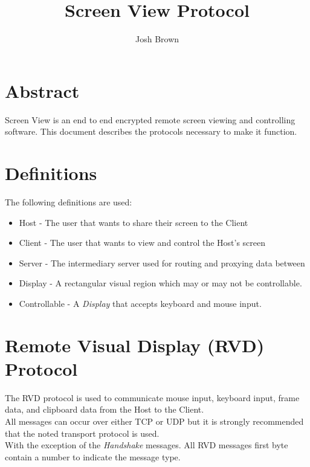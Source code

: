 \documentclass{article}
\title{Screen View Protocol}
\author{Josh Brown}
\newcommand{\projectName}{Screen View}
\begin{document}
    \maketitle
    \newpage
    \tableofcontents
    \newpage


    \section{Abstract}
    \projectName{} is an end to end encrypted remote screen viewing and controlling software. This document describes
    the protocols necessary to make it function.

    \newpage


    \section{Definitions}
    The following definitions are used:

    \begin{itemize}
        \item Host - The user that wants to share their screen to the Client
        \item Client - The user that wants to view and control the Host's screen
        \item Server - The intermediary server used for routing and proxying data between
        \item Display - A rectangular visual region which may or may not be controllable.
        \item Controllable - A \emph{Display} that accepts keyboard and mouse input.
    \end{itemize}


    \section{Remote Visual Display (RVD) Protocol}

    The RVD protocol is used to communicate mouse input, keyboard input, frame data, and clipboard data from the Host to the Client.\\

    All messages can occur over either TCP or UDP but it is strongly recommended that the noted transport protocol is used.\\

    With the exception of the \emph{Handshake} messages. All RVD messages first byte contain a number to indicate the message type.
\end{document}
